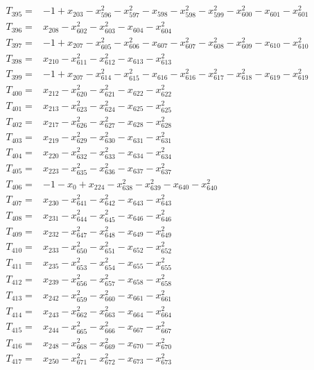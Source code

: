 \begin{align*}
T_{395}={}&-1+x_{203}-x_{596}^{2}-x_{597}^{2}-x_{598}-x_{598}^{2}-x_{599}^{2}-x_{600}^{2}-x_{601}-x_{601}^{2}\\[3pt]
T_{396}={}&x_{208}-x_{602}^{2}-x_{603}^{2}-x_{604}-x_{604}^{2}\\[3pt]
T_{397}={}&-1+x_{207}-x_{605}^{2}-x_{606}^{2}-x_{607}-x_{607}^{2}-x_{608}^{2}-x_{609}^{2}-x_{610}-x_{610}^{2}\\[3pt]
T_{398}={}&x_{210}-x_{611}^{2}-x_{612}^{2}-x_{613}-x_{613}^{2}\\[3pt]
T_{399}={}&-1+x_{207}-x_{614}^{2}-x_{615}^{2}-x_{616}-x_{616}^{2}-x_{617}^{2}-x_{618}^{2}-x_{619}-x_{619}^{2}\\[3pt]
T_{400}={}&x_{212}-x_{620}^{2}-x_{621}^{2}-x_{622}-x_{622}^{2}\\[3pt]
T_{401}={}&x_{213}-x_{623}^{2}-x_{624}^{2}-x_{625}-x_{625}^{2}\\[3pt]
T_{402}={}&x_{217}-x_{626}^{2}-x_{627}^{2}-x_{628}-x_{628}^{2}\\[3pt]
T_{403}={}&x_{219}-x_{629}^{2}-x_{630}^{2}-x_{631}-x_{631}^{2}\\[3pt]
T_{404}={}&x_{220}-x_{632}^{2}-x_{633}^{2}-x_{634}-x_{634}^{2}\\[3pt]
T_{405}={}&x_{223}-x_{635}^{2}-x_{636}^{2}-x_{637}-x_{637}^{2}\\[3pt]
T_{406}={}&-1-x_{0}+x_{224}-x_{638}^{2}-x_{639}^{2}-x_{640}-x_{640}^{2}\\[3pt]
T_{407}={}&x_{230}-x_{641}^{2}-x_{642}^{2}-x_{643}-x_{643}^{2}\\[3pt]
T_{408}={}&x_{231}-x_{644}^{2}-x_{645}^{2}-x_{646}-x_{646}^{2}\\[3pt]
T_{409}={}&x_{232}-x_{647}^{2}-x_{648}^{2}-x_{649}-x_{649}^{2}\\[3pt]
T_{410}={}&x_{233}-x_{650}^{2}-x_{651}^{2}-x_{652}-x_{652}^{2}\\[3pt]
T_{411}={}&x_{235}-x_{653}^{2}-x_{654}^{2}-x_{655}-x_{655}^{2}\\[3pt]
T_{412}={}&x_{239}-x_{656}^{2}-x_{657}^{2}-x_{658}-x_{658}^{2}\\[3pt]
T_{413}={}&x_{242}-x_{659}^{2}-x_{660}^{2}-x_{661}-x_{661}^{2}\\[3pt]
T_{414}={}&x_{243}-x_{662}^{2}-x_{663}^{2}-x_{664}-x_{664}^{2}\\[3pt]
T_{415}={}&x_{244}-x_{665}^{2}-x_{666}^{2}-x_{667}-x_{667}^{2}\\[3pt]
T_{416}={}&x_{248}-x_{668}^{2}-x_{669}^{2}-x_{670}-x_{670}^{2}\\[3pt]
T_{417}={}&x_{250}-x_{671}^{2}-x_{672}^{2}-x_{673}-x_{673}^{2}\\[3pt]

\end{align*}

